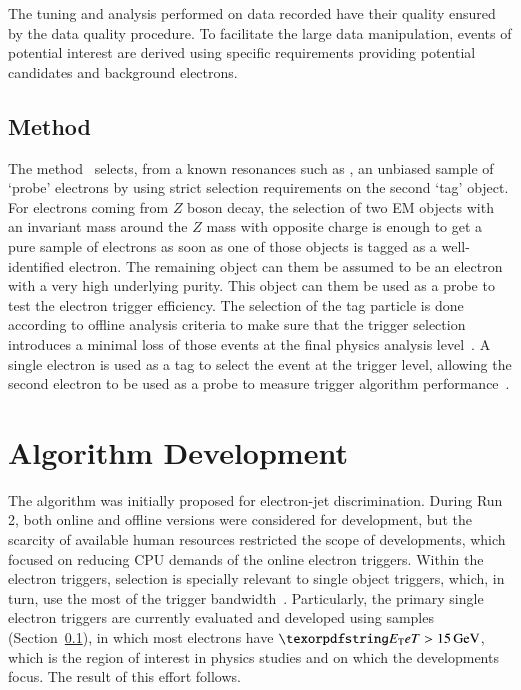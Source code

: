 The tuning and analysis performed on data recorded have their quality ensured by the data quality procedure. To facilitate the large data manipulation, events of potential interest are derived using specific requirements providing potential \Zee{} \tnp{} candidates and background electrons. 

%


\subsection{\TnP Method}\label{ssec:tnp}

The \tnp{} method~\cite{PERF-2016-01} selects, from a known resonances such as \Zee{}, an unbiased sample of `probe' electrons by using strict selection requirements on the second `tag' object. For electrons coming from $Z$ boson decay, the selection of two EM objects with an invariant mass around the $Z$ mass with opposite charge is enough to get a pure sample of electrons as soon as one of those objects is tagged as a well-identified electron. The remaining object can them be assumed to be an electron with a very high underlying purity. This object can them be used as a probe to test the electron trigger efficiency. The selection of the tag particle is done according to offline analysis criteria to make sure that the trigger selection introduces a minimal loss of those events at the final physics analysis level~\cite{aaboud2019electron}. A single electron is used as a tag to select the event at the trigger level, allowing the second electron to be used as a probe to measure trigger algorithm performance~\cite{aad2020performance}.


\section{Algorithm Development}\label{ssec:rnn_for_online_and_eletrons}

The \rnn{} algorithm was initially proposed for electron-jet discrimination. 
During Run 2, both online and offline versions
were considered for  development, but the scarcity of available human resources restricted the scope of developments, which focused on reducing CPU demands of the online electron triggers. Within the electron triggers, \hlt{} selection is
specially relevant to single object triggers, which, in turn, use the most of the trigger bandwidth~\cite{aad2020performance}. Particularly, the primary single electron triggers
are currently evaluated and developed using \Zee{} \tnp{} samples 
(Section~\ref{ssec:tnp}), in which most electrons have $\et>\SI{15}{\GeV}$, which is the region of interest in physics studies and on which the \rnn{} developments focus. The result of this effort
follows.



